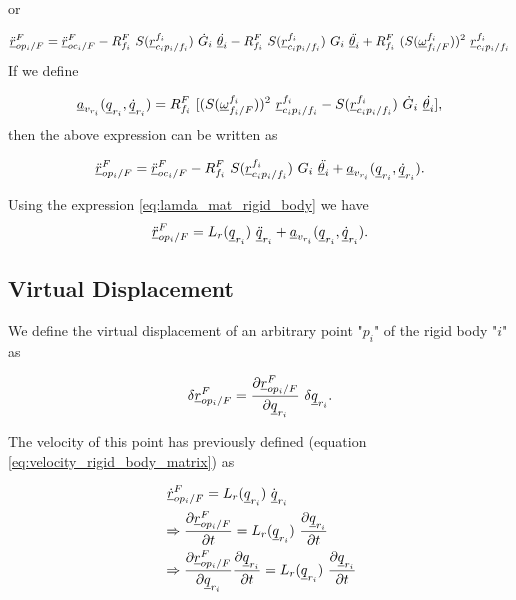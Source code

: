 or 

\[
    \pvec{\ddot{r}}{op_{i}}{F}{F} = \pvec{\ddot{r}}{oc_{i}}{F}{F} - 
    \rot{R}{f_{i}}{F} \ S(\pvec{r}{c_{i}p_{i}}{f_i}{f_i}) \ \dot{G}_{i} \ \dot{\vecd{\theta}_{i}}
    -     \rot{R}{f_{i}}{F} \ S(\pvec{r}{c_{i}p_{i}}{f_i}{f_i}) \ {G}_{i} \ \ddot{\vecd{\theta}_{i}}
    + \rot{R}{f_{i}}{F} \ (S(\pvec{\omega}{f_{i}}{F}{f_i}))^{2} \ \pvec{r}{c_{i}p_{i}}{f_i}{f_i}  
    \]
If we define 

\begin{equation}    
\vecd{a}_{v_{r_i}}(\vecd{q}_{r_{i}}, \vecd{\dot{q}}_{r_{i}}) = 
    \rot{R}{f_{i}}{F}\ [ (S(\pvec{\omega}{f_{i}}{F}{f_i}))^{2} \ \pvec{r}{c_{i}p_{i}}{f_i}{f_i}  
    - S(\pvec{r}{c_{i}p_{i}}{f_i}{f_i}) \ \dot{G}_{i} \ \dot{\vecd{\theta}_{i}}],
    \label{eq:coriolis_acceleration_rigid_body}
\end{equation}
then the above expression can be written as 

\[    
    \pvec{\ddot{r}}{op_{i}}{F}{F} = \pvec{\ddot{r}}{oc_{i}}{F}{F} 
    - \rot{R}{f_{i}}{F} \ S(\pvec{r}{c_{i}p_{i}}{f_i}{f_i}) \ {G}_{i} \ 
    \ddot{\vecd{\theta}_{i}} + \vecd{a}_{v_{r_i}}(\vecd{q}_{r_{i}}, 
    \vecd{\dot{q}}_{r_{i}}). 
\] 

Using the expression \eqref{eq:lamda_mat_rigid_body} we have 
\begin{equation} 
    \pvec{\ddot{r}}{op_{i}}{F}{F} = L_{r}(\vecd{q}_{r_{i}}) \ 
    \vecd{\ddot{q}}_{r_{i}} + \vecd{a}_{v_{r_i}}(\vecd{q}_{r_{i}}, 
    \vecd{\dot{q}}_{r_{i}}).
    \label{eq:acceleration_rigid_body_matrix}
\end{equation}

\subsection{Virtual Displacement}

We define the virtual displacement of an arbitrary point "$p_{i}$" of the 
rigid body "$i$" as 

\begin{equation}
    \delta \pvec{r}{op_{i}}{F}{F} = \frac{\partial \pvec{r}{op_{i}}{F}{F}}{\partial\vecd{q}_{r_{i}}}
    \ \delta \vecd{q}_{r_{i}}.
    \label{eq:virtual_displacement_in}
\end{equation}

The velocity of this point has previously defined 
(equation \eqref{eq:velocity_rigid_body_matrix}) as 

\begin{align*}
    & \ \pvec{\dot{r}}{op_{i}}{F}{F}  = L_{r}(\vecd{q}_{r_{i}}) \ \dot{\vecd{q}}_{r_{i}} \\ 
    & \Rightarrow  \frac{\partial \pvec{r}{op_{i}}{F}{F}}{\partial t} = 
    L_{r}(\vecd{q}_{r_{i}}) \ \frac{\partial \vecd{q}_{r_{i}}}{\partial t} \\ 
    & \Rightarrow  \frac{\partial \pvec{r}{op_{i}}{F}{F}}{\partial \vecd{q}_{r_{i}}} 
    \frac{\partial \vecd{q}_{r_{i}}}{\partial t} = 
    L_{r}(\vecd{q}_{r_{i}}) \ \frac{\partial \vecd{q}_{r_{i}}}{\partial t}
\end{align*}

